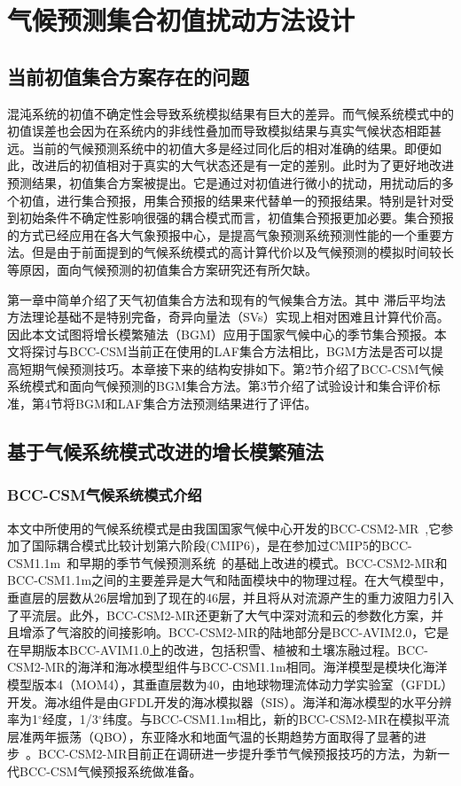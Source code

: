\chapter{气候预测集合初值扰动方法设计}
\label{cha:china}
\section{当前初值集合方案存在的问题}

混沌系统的初值不确定性会导致系统模拟结果有巨大的差异。而气候系统模式中的初值误差也会因为在系统内的非线性叠加而导致模拟结果与真实气候状态相距甚远。当前的气候预测系统中的初值大多是经过同化后的相对准确的结果。即便如此，改进后的初值相对于真实的大气状态还是有一定的差别。此时为了更好地改进预测结果，初值集合方案被提出。它是通过对初值进行微小的扰动，用扰动后的多个初值，进行集合预报，用集合预报的结果来代替单一的预报结果。特别是针对受到初始条件不确定性影响很强的耦合模式而言，初值集合预报更加必要。集合预报的方式已经应用在各大气象预报中心，是提高气象预测系统预测性能的一个重要方法。但是由于前面提到的气候系统模式的高计算代价以及气候预测的模拟时间较长等原因，面向气候预测的初值集合方案研究还有所欠缺。

第一章中简单介绍了天气初值集合方法和现有的气候集合方法。其中 滞后平均法方法理论基础不是特别完备，奇异向量法（SVs）实现上相对困难且计算代价高。因此本文试图将增长模繁殖法（BGM）应用于国家气候中心的季节集合预报。本文将探讨与BCC-CSM当前正在使用的LAF集合方法相比，BGM方法是否可以提高短期气候预测技巧。本章接下来的结构安排如下。第2节介绍了BCC-CSM气候系统模式和面向气候预测的BGM集合方法。第3节介绍了试验设计和集合评价标准，第4节将BGM和LAF集合方法预测结果进行了评估。

\section{基于气候系统模式改进的增长模繁殖法}
\subsection{BCC-CSM气候系统模式介绍}
本文中所使用的气候系统模式是由我国国家气候中心开发的BCC-CSM2-MR~\cite{wu2019beijing},它参加了国际耦合模式比较计划第六阶段(CMIP6)，是在参加过CMIP5的BCC-CSM1.1m~\cite{wu2013global,xiao2013introduction}和早期的季节气候预测系统~\cite{liu2014relationships,liu2015performance}的基础上改进的模式。BCC-CSM2-MR和BCC-CSM1.1m之间的主要差异是大气和陆面模块中的物理过程。在大气模型中，垂直层的层数从26层增加到了现在的46层，并且将从对流源产生的重力波阻力引入了平流层。此外，BCC-CSM2-MR还更新了大气中深对流和云的参数化方案，并且增添了气溶胶的间接影响。BCC-CSM2-MR的陆地部分是BCC-AVIM2.0，它是在早期版本BCC-AVIM1.0上的改进，包括积雪、植被和土壤冻融过程。BCC-CSM2-MR的海洋和海冰模型组件与BCC-CSM1.1m相同。海洋模型是模块化海洋模型版本4（MOM4），其垂直层数为40，由地球物理流体动力学实验室（GFDL）开发。海冰组件是由GFDL开发的海冰模拟器（SIS）。海洋和海冰模型的水平分辨率为1$^\circ$经度，1/3$^\circ$纬度。与BCC-CSM1.1m相比，新的BCC-CSM2-MR在模拟平流层准两年振荡（QBO），东亚降水和地面气温的长期趋势方面取得了显著的进步~\cite{wu2019beijing}。BCC-CSM2-MR目前正在调研进一步提升季节气候预报技巧的方法，为新一代BCC-CSM气候预报系统做准备。
